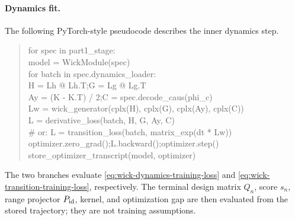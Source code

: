 \documentclass[11pt]{article}
\numberwithin{section}{part}
\theoremstyle{plain}
\theoremstyle{definition}
\theoremstyle{remark}
\begin{document}
\paragraph{Dynamics fit.}
The following PyTorch-style pseudocode describes the inner dynamics step.
\begin{quote}
\small\ttfamily
for spec in part1\_stage:\\
\quad model = WickModule(spec)\\
\quad for batch in spec.dynamics\_loader:\\
\qquad H = Lh @ Lh.T;\quad G = Lg @ Lg.T\\
\qquad Ay = (K - K.T) / 2;\quad C = spec.decode\_caus(phi\_c)\\
\qquad Lw = wick\_generator(cplx(H), cplx(G), cplx(Ay), cplx(C))\\
\qquad L = derivative\_loss(batch, H, G, Ay, C)\\
\qquad \# or: L = transition\_loss(batch, matrix\_exp(dt * Lw))\\
\qquad optimizer.zero\_grad();\quad L.backward();\quad optimizer.step()\\
\quad store\_optimizer\_transcript(model, optimizer)
\end{quote}
The two branches evaluate
\eqref{eq:wick-dynamics-training-loss} and
\eqref{eq:wick-transition-training-loss}, respectively.  The terminal
design matrix \(Q_n\), score \(s_n\), range projector \(P_{\rm id}\), kernel,
and optimization gap are then evaluated from the stored trajectory; they are
not training assumptions.
\end{document}
